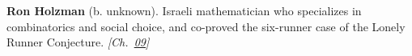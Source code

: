\textbf{Ron Holzman} (b. unknown). Israeli mathematician who specializes in combinatorics and social choice, and co-proved the six-runner case of the Lonely Runner Conjecture. \emph{[Ch.~\hyperref[ch:arrowtheoremtopology]{09}]}

